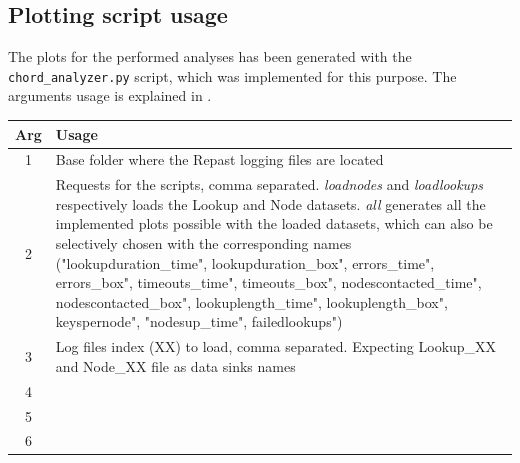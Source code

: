 \documentclass[11pt,twocolumn,letterpaper]{article}
\begin{document}
	\subsection{Plotting script usage}
		The plots for the performed analyses has been generated with the \texttt{chord\_analyzer.py} script, which was implemented for this purpose. The arguments usage is explained in .
		\begin{table}[!h]
			\centering
			\begin{tabular}{cl}
				\hline
				\textbf{Arg} & \textbf{Usage}\\
				\hline
				1 & Base folder where the Repast logging files are located\\
				\hline
				2 & Requests for the scripts, comma separated. \textit{loadnodes} and \textit{loadlookups} respectively loads the Lookup and Node datasets. \textit{all} generates all the implemented plots possible with the loaded datasets, which can also be selectively chosen with the corresponding names ("lookupduration\_time", lookupduration\_box", errors\_time", errors\_box", timeouts\_time", timeouts\_box", nodescontacted\_time", nodescontacted\_box", lookuplength\_time", lookuplength\_box", keyspernode", "nodesup\_time", failedlookups")\\
				\hline
				3 & Log files index (XX) to load, comma separated. Expecting Lookup\_XX and Node\_XX file as data sinks names\\
				\hline
				4 & \\
				\hline
				5 & \\
				\hline
				6 & \\
				\hline
			\end{tabular}
		\end{table}

	\clearpage
	\printbibliography
\end{document}
